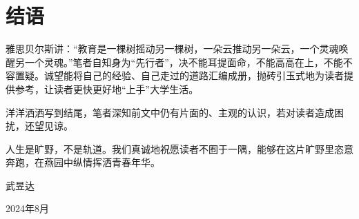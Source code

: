 \documentclass[11pt,oneside]{book}
\begin{document}
\chapter*{结语}
雅思贝尔斯讲：“教育是一棵树摇动另一棵树，一朵云推动另一朵云，一个灵魂唤醒另一个灵魂。”笔者自知身为“先行者”，决不能耳提面命，不能高高在上，不能不容置疑。诚望能将自己的经验、自己走过的道路汇编成册，抛砖引玉式地为读者提供参考，让读者更快更好地“上手”大学生活。

洋洋洒洒写到结尾，笔者深知前文中仍有片面的、主观的认识，若对读者造成困扰，还望见谅。

人生是旷野，不是轨道。我们真诚地祝愿读者不囿于一隅，能够在这片旷野里恣意奔跑，在燕园中纵情挥洒青春年华。

\begin{flushright}
    武昱达

    2024年8月
\end{flushright}
\end{document}
